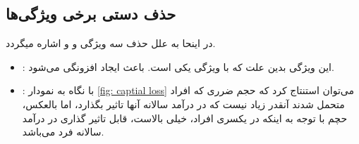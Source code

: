 \documentclass{article}
\begin{document}
\subsection{حذف دستی برخی ویژگی‌ها}
در اینحا به علل حذف سه ویژگی 
و
و
اشاره میگردد.
\begin{itemize}
	\item {}:
	 این ویژگی بدین علت که با ویژگی
	 یکی است. باعث ایجاد افزونگی می‌شود.
	\item {}:
	با نگاه به نمودار 
	\ref{fig: captial loss}
	می‌توان استنتاج کرد که حجم ضرری که افراد متحمل شدند آنقدر زیاد نیست که در درآمد سالانه آنها تاثیر بگذارد، اما بالعکس، حچم  با توجه به اینکه در یکسری افراد، خیلی بالاست، قابل تاثیر گذاری در درآمد سالانه فرد می‌باشد.
\end{itemize}
	
\end{document}
